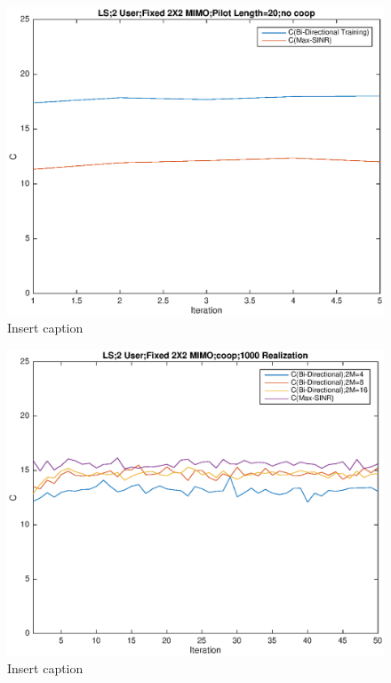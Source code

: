 \documentclass[11pt, oneside]{article}   	%
\begin{document}
\begin{figure}[bp!]
    \centering
    \centerline{\includegraphics[width=220mm]{no_coop}}
    \caption{Insert caption}
\end{figure} 

\begin{figure}[bp!]
    \centering
    \centerline{\includegraphics[width=220mm]{coop}}
    \caption{Insert caption}
\end{figure} 

 
\end{document}
